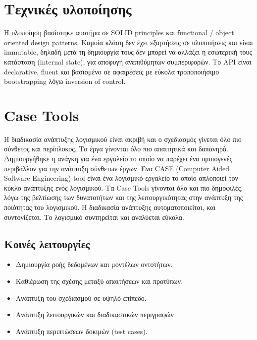 \section{Τεχνικές υλοποίησης}
Η υλοποίηση βασίστηκε αυστήρα σε SOLID principles και functional / object oriented design patterns.  Καμοία κλάση δεν έχει εξαρτήσεις σε υλοποιήσεις και είναι immutable, δηλαδή μετά τη δημιουργία τους δεν μπορεί να αλλάξει η εσωτερική τους κατάσταση (internal state), για αποφυγή ανεπιθύμητων συμπεριφορών. Το API είναι declarative, fluent και βασισμένο σε αφαιρέσεις με εύκολα τροποποιήσιμο bootstrapping λόγω inversion of control.

\section{Case Tools}
Η διαδικασία ανάπτυξης λογισμικού είναι ακριβή και ο σχεδιασμός γίνεται όλο πιο σύνθετος και περίπλοκος. Τα έργα γίνονται όλο πιο απαιτητικά και δαπανηρά. Δημιουργήθηκε η ανάγκη για ένα εργαλείο το οποίο να παρέχει ένα ομοιογενές περιβάλλον για την ανάπτυξη σύνθετων έργων. 
Ένα CASE (Computer Aided Software Engineering) tool είναι ένα λογισμικό-εργαλείο το οποίο απλοποιεί τον κύκλο ανάπτυξης ενός λογισμικού. Τα Case Tools γίνονται όλο και πιο δημοφιλές, λόγω της βελτίωσης των δυνατοτήτων και της λειτουργικότητας στην ανάπτυξη της ποιότητας του λογισμικού. Η διαδικασία ανάπτυξης αυτοματοποιείται, και συντονίζεται. Το λογισμικό συντηρείται και αναλύεται εύκολα. 

\subsection{Kοινές λειτουργίες}
\begin{itemize}
	\item Δημιουργία ροής δεδομένων και μοντέλων οντοτήτων.
	\item Καθιέρωση της σχέσης μεταξύ απαιτήσεων και προτύπων.
	\item Ανάπτυξη του σχεδιασμού σε υψηλό επίπεδο.
	\item Ανάπτυξη λειτουργικών και διαδικαστικών περιγραφών
	\item Ανάπτυξη περιπτώσεων δοκιμών (test cases).	
\end{itemize}

